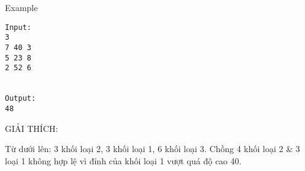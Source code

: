 Example
\begin{verbatim}
Input:
3
7 40 3
5 23 8
2 52 6


Output:
48
\end{verbatim}

GIẢI THÍCH:

Từ dưới lên: 3 khối loại 2, 3 khối loại 1, 6 khối loại 3. Chồng 4 khối loại 2 \& 3 loại 1 không hợp lệ vì đỉnh của khối loại 1 vượt quá độ cao 40.